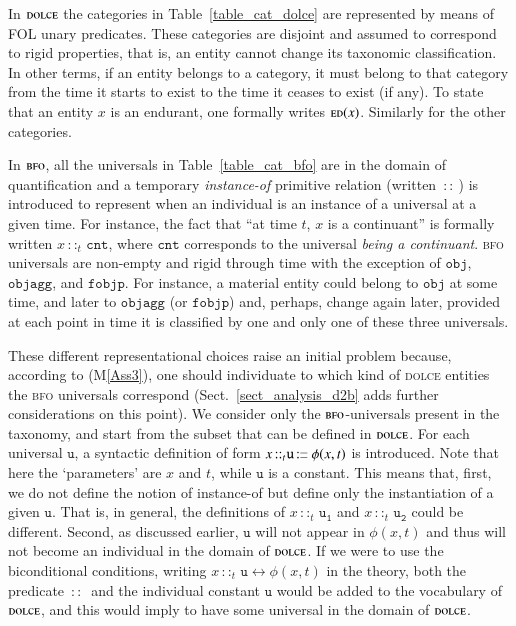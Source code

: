 \documentclass[ao]{iosart2x}
\newcommand{\nb}[1]{\textcolor{red}{$|$}\marginpar{\hspace*{-0cm}\parbox{20mm}{\scriptsize\raggedright\textcolor{red}{#1}}}}
\newcommand{\cn}[1]{\mathtt{#1}}
\newcommand{\ifif}{\leftrightarrow}
\newcommand\textequal{%
 \rule[.08ex]{5pt}{0.35pt}\llap{\rule[.78ex]{5pt}{0.35pt}}}
\newcommand{\sdef}{{\hspace{1.5pt}:\hspace{-2.5pt}\textequal\hspace{3pt}}}
\newcommand{\dolce}{{\textsc{dolce}}}
\newcommand{\bfo}{{\textsc{bfo}}}
\newcommand {\EDdcat} {\textsc{ed}}
\newcommand{\cntbcat}{\cn{cnt}}
\newcommand{\objbcat}{\cn{obj}}
\newcommand{\fobjbcat}{\cn{fobjp}}
\newcommand{\objaggbcat}{\cn{objagg}}
\newcommand{\bfoiof}[1]{{\,::_{#1\:\!}}}
\begin{document}
In  {$\dolce$} the categories in  Table~\ref{table_cat_dolce} are represented by means of FOL unary predicates. These categories are disjoint and assumed to correspond to rigid properties, that is, an entity cannot change its taxonomic classification. In other terms, if an entity belongs to a category, it must belong to that category from the time it starts to exist to the time it ceases to exist (if any). To state that an entity $x$ is an endurant, one formally writes $\EDdcat(x)$. Similarly for the other categories.

In {$\bfo$}, all the universals in Table~\ref{table_cat_bfo} are in the domain of quantification and a temporary \emph{instance-of} primitive relation (written $\bfoiof{}$) is introduced to represent when %
an individual is an instance of a universal at a given time. For instance, the fact that ``at time $t$, $x$ is a continuant'' is formally written $x \bfoiof{t} \cntbcat$, where $\cntbcat$ corresponds to the universal \emph{being a continuant}.
{\bfo} universals are non-empty and rigid through time %
with the exception of $\objbcat$, $\objaggbcat$, and $\fobjbcat$. For instance, a material entity could belong to $\objbcat$ at some time, and later to $\objaggbcat$ (or $\fobjbcat$) and, perhaps, change again later, provided at each point in time it is classified by one and only one of these three universals.

These different representational choices raise an initial problem because, according to (M\ref{Ass3}), one should individuate to which kind of {\dolce} entities the {\bfo} universals correspond (Sect.~\ref{sect_analysis_d2b} adds further considerations on this point). 
We consider only 
the {$\bfo$}-universals present in the taxonomy, and start from the subset that can be defined in {$\dolce$}. 
For each universal $\cn{u}$, a syntactic definition of form $x \bfoiof{t} \cn{u} \sdef \phi(x,t)$ is introduced. Note that here the `parameters' are $x$ and $t$, while $\cn{u}$ is a constant. This means that, first, we do not define the notion of instance-of but 
define only the instantiation of a given $\cn{u}$. That is, in general, the definitions of $x \bfoiof{t} \cn{u_1}$ and  $x \bfoiof{t} \cn{u_2}$ could be different. 
Second, as discussed earlier, $\cn{u}$ will not appear in $\phi(x,t)$ and thus will not become an individual in the domain of {$\dolce$}. If we were to use the biconditional conditions, writing $x \bfoiof{t} \cn{u} \ifif \phi(x,t)$ in the theory, both the predicate $\bfoiof{}$ and the individual constant $\cn{u}$ would be added to the vocabulary of {$\dolce$}, and this would imply to have some universal in the domain of {$\dolce$}. 
\end{document}
